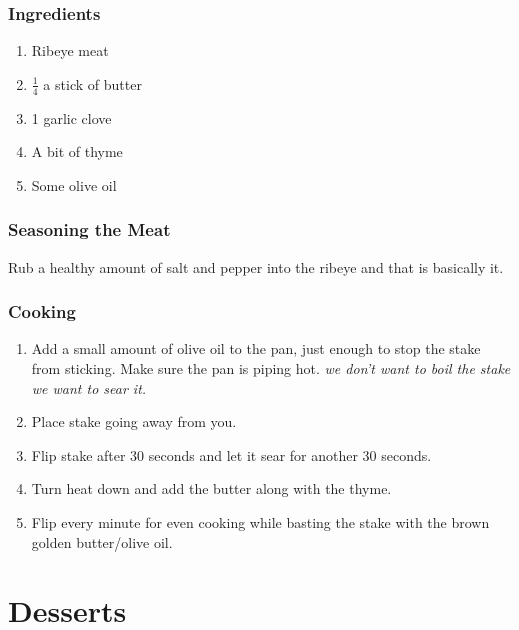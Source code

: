 \subsection{Ingredients}
\begin{enumerate}
    \item Ribeye meat
    \item $\frac{1}{4}$ a stick of butter
    \item 1 garlic clove
    \item A bit of thyme
    \item Some olive oil
\end{enumerate}

\subsection{Seasoning the Meat}
Rub a healthy amount of salt and pepper into the ribeye and that is basically it.

\subsection{Cooking}
\begin{enumerate}
    \item Add a small amount of olive oil to the pan, just enough to stop the stake from sticking. Make sure the pan is piping hot. \textit{we don't want to boil the stake we want to sear it.}
    \item Place stake going away from you.
    \item Flip stake after 30 seconds and let it sear for another 30 seconds.
    \item Turn heat down and add the butter along with the thyme.
    \item Flip every minute for even cooking while basting the stake with the brown golden butter/olive oil.
\end{enumerate}


\chapter{Desserts}

